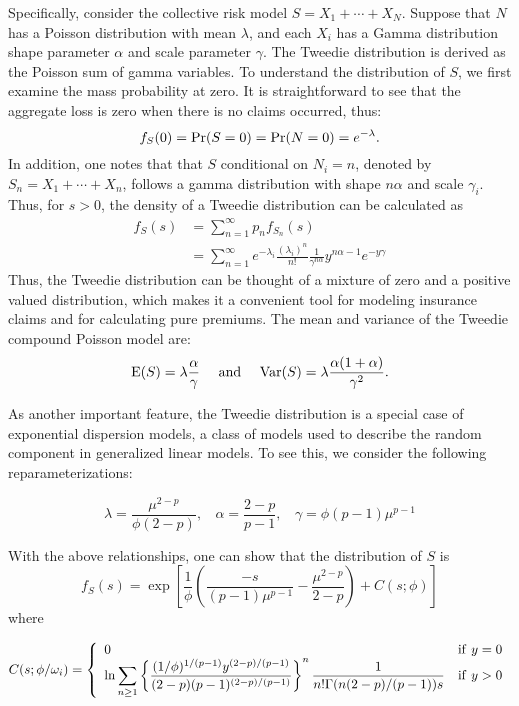 \documentclass[]{book}
\theoremstyle{definition}
\theoremstyle{definition}
\theoremstyle{definition}
\theoremstyle{remark}
\begin{document}
Specifically, consider the collective risk model \(S=X_1+\cdots+X_N\).
Suppose that \(N\) has a Poisson distribution with mean \(\lambda\), and
each \(X_i\) has a Gamma distribution shape parameter \(\alpha\) and
scale parameter \(\gamma\). The Tweedie distribution is derived as the
Poisson sum of gamma variables. To understand the distribution of \(S\),
we first examine the mass probability at zero. It is straightforward to
see that the aggregate loss is zero when there is no claims occurred,
thus: \[f_S(0)={\rm Pr}(S=0)= {\rm Pr}(N=0)=e^{-\lambda}.\] In addition,
one notes that that \(S\) conditional on \(N_i=n\), denoted by
\(S_n=X_1+\cdots+X_n\), follows a gamma distribution with shape
\(n\alpha\) and scale \(\gamma_i\). Thus, for \(s>0\), the density of a
Tweedie distribution can be calculated as \[\begin{aligned}
f_S(s)&=\sum_{n=1}^{\infty} p_n f_{S_n}(s)\\
&=\sum_{n=1}^{\infty}e^{-\lambda_i}\frac{(\lambda_i)^n}{n!}\frac{1}{\gamma^{n\alpha}}y^{n\alpha-1}e^{-y\gamma}
\end{aligned}\] Thus, the Tweedie distribution can be thought of a
mixture of zero and a positive valued distribution, which makes it a
convenient tool for modeling insurance claims and for calculating pure
premiums. The mean and variance of the Tweedie compound Poisson model
are:
\[{\rm E} (S)=\lambda\frac{\alpha}{\gamma}~~~~{\rm and}~~~~{\rm Var} (S)=\lambda\frac{\alpha(1+\alpha)}{\gamma^2}.\]

As another important feature, the Tweedie distribution is a special case
of exponential dispersion models, a class of models used to describe the
random component in generalized linear models. To see this, we consider
the following reparameterizations:

\begin{equation*}
\lambda=\frac{\mu^{2-p}}{\phi(2-p)},~~~~\alpha=\frac{2-p}{p-1},~~~~\gamma=\phi(p-1)\mu^{p-1}
\end{equation*}

With the above relationships, one can show that the distribution of
\(S\) is
\[f_S(s)=\exp\left[\frac{1}{\phi}\left(\frac{-s}{(p-1)\mu^{p-1}}-\frac{\mu^{2-p}}{2-p}\right)+C(s;\phi)\right]\]
where

\begin{equation*}
C(s;\phi/\omega_i)=\left\{\begin{array}{ll}
                    \displaystyle 0 & {\rm if}~ y=0 \\
                   \displaystyle \ln \sum\limits_{n\ge 1} \left\{\frac{(1/\phi)^{1/(p-1)}y^{(2-p)/(p-1)}}{(2-p)(p-1)^{(2-p)/(p-1)}}\right\}^{n}\frac{1}{n!\Gamma(n(2-p)/(p-1))s} & {\rm if}~ y>0
                  \end{array}\right.
\end{equation*}
\end{document}
